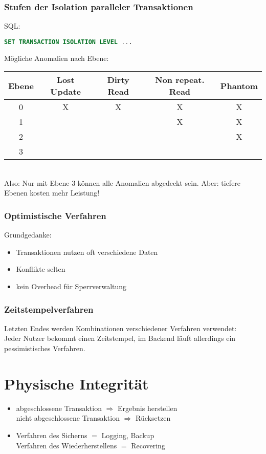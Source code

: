 \subsubsection{Stufen der Isolation paralleler Transaktionen}
SQL:
\begin{lstlisting}[language=SQL]
SET TRANSACTION ISOLATION LEVEL ...
\end{lstlisting}
Mögliche Anomalien nach Ebene:\\
\begin{tabular}{c | c | c | c | c}
Ebene & Lost Update & Dirty Read & Non repeat. Read & Phantom\\\hline
0 & X & X & X  & X\\
1 & & & X & X\\
2 & & & & X\\
3 &&&&\\
\end{tabular}\\
Also: Nur mit Ebene-3 können alle Anomalien abgedeckt sein. Aber: tiefere Ebenen kosten mehr Leistung!

\subsubsection{Optimistische Verfahren}
Grundgedanke:
\begin{itemize}
\item Transaktionen nutzen oft verschiedene Daten
\item Konflikte selten
\item kein Overhead für Sperrverwaltung
\end{itemize}

\subsubsection{Zeitstempelverfahren}

Letzten Endes werden Kombinationen verschiedener Verfahren verwendet:\\
Jeder Nutzer bekommt einen Zeitstempel, im Backend läuft allerdings ein pessimistisches Verfahren.
\section{Physische Integrität}
\begin{itemize}
\item abgeschlossene Transaktion $\Rightarrow$ Ergebnis herstellen\\
nicht abgeschlossene Transaktion $\Rightarrow$ Rücksetzen
\item Verfahren des Sicherns $=$ Logging, Backup\\
Verfahren des Wiederherstellens $=$ Recovering
\end{itemize}
